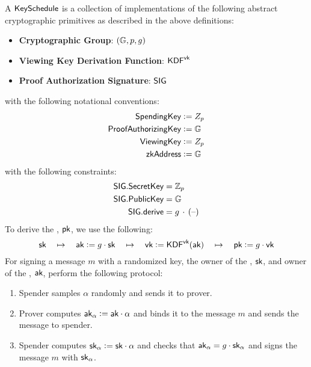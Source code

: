\begin{definition}
    A ${\textsf{KeySchedule}}$ is a collection of implementations of the following abstract cryptographic primitives as described in the above definitions:
    \begin{itemize}
        \item \textbf{Cryptographic Group}: $({\mathbb{G}}, p, g)$
        \item \textbf{Viewing Key Derivation Function}: ${\textsf{KDF}}^{\textsf{vk}}$
        \item \textbf{Proof Authorization Signature}: ${\textsf{SIG}}$
    \end{itemize}
    with the following notational conventions:
    \begin{align*}
        {\textsf{SpendingKey}}         &:= Z_p \\
        {\textsf{ProofAuthorizingKey}} &:= {\mathbb{G}} \\
        {\textsf{ViewingKey}}          &:= Z_p \\
        {\textsf{zkAddress}}           &:= {\mathbb{G}}
    \end{align*}
    with the following constraints:
    \begin{align*}
        {\textsf{SIG}}.{\textsf{SecretKey}} &= {\mathbb{Z}}_p \\
        {\textsf{SIG}}.{\textsf{PublicKey}} &= {\mathbb{G}} \\
        {\textsf{SIG}}.{\textsf{derive}}    &= g\,\cdot\,({\textrm{--}})
    \end{align*}
    To derive the \zkAddress{}, ${\textsf{pk}}$, we use the following:
    \[{\textsf{sk}} \quad\mapsto\quad {\textsf{ak}} := g \cdot {\textsf{sk}} \quad\mapsto\quad {\textsf{vk}} := {\textsf{KDF}}^{\textsf{vk}}({\textsf{ak}}) \quad\mapsto\quad {\textsf{pk}} := g \cdot {\textsf{vk}}\]
    For signing a message $m$ with a randomized key, the owner of the \SpendingKey{}, ${\textsf{sk}}$, and owner of the \ProofAuthorizingKey{}, ${\textsf{ak}}$, perform the following protocol:
    \begin{enumerate}
        \item Spender samples $\alpha$ randomly and sends it to prover.
        \item Prover computes ${\textsf{ak}}_\alpha := {\textsf{ak}} \cdot \alpha$ and binds it to the message $m$ and sends the message to spender.
        \item Spender computes ${\textsf{sk}}_\alpha := {\textsf{sk}} \cdot \alpha$ and checks that ${\textsf{ak}}_\alpha = g \cdot {\textsf{sk}}_\alpha$ and signs the message $m$ with ${\textsf{sk}}_\alpha$.
    \end{enumerate}
\end{definition}


